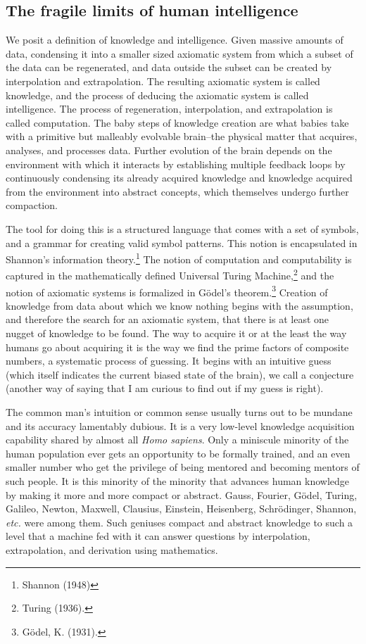 \begin{multicols}{2}
\subsection{The fragile limits of human intelligence}

\vskip -5pt

We posit a definition of knowledge and intelligence. Given massive amounts of data, condensing it into a smaller sized axiomatic system from which a subset of the data can be regenerated, and data outside the subset can be created by interpolation and extrapolation. The resulting axiomatic system is called knowledge, and the process of deducing the axiomatic system is called intelligence. The process of regeneration, interpolation, and extrapolation is called computation. The baby steps of knowledge creation are what babies take with a primitive but malleably evolvable brain--the physical matter that acquires, analyses, and processes data. Further evolution of the brain depends on the environment with which it interacts by establishing multiple feedback loops by continuously condensing its already acquired knowledge and knowledge acquired from the environment into abstract concepts, which themselves undergo further compaction.

The tool for doing this is a structured language that comes with a set of symbols, and a grammar for creating valid symbol patterns. This notion is encapsulated in Shannon's information theory.\footnote{Shannon (1948)}  The notion of computation and computability is captured in the mathematically defined Universal Turing Machine,\footnote{Turing (1936).}  and the notion of axiomatic systems is formalized in Gödel's theorem.\footnote{Gödel, K. (1931).}  Creation of knowledge from data about which we know nothing begins with the assumption, and therefore the search for an axiomatic system, that there is at least one nugget of knowledge to be found. The way to acquire it or at the least the way humans go about acquiring it is the way we find the prime factors of composite numbers, a systematic process of guessing. It begins with an intuitive guess (which itself indicates the current biased state of the brain), we call a conjecture (another way of saying that I am curious to find out if my guess is right).

The common man's intuition or common sense usually turns out to be mundane and its accuracy lamentably dubious. It is a very low-level knowledge acquisition capability shared by almost all \textit{Homo sapiens}. Only a miniscule minority of the human population ever gets an opportunity to be formally trained, and an even smaller number who get the privilege of being mentored and becoming mentors of such people. It is this minority of the minority that advances human knowledge by making it more and more compact or abstract. Gauss, Fourier, Gödel, Turing, Galileo, Newton, Maxwell, Clausius, Einstein, Heisenberg, Schrödinger, Shannon, \textit{etc.} were among them. Such geniuses compact and abstract knowledge to such a level that a machine fed with it can answer questions by interpolation, extrapolation, and derivation using mathematics.


\end{multicols}
